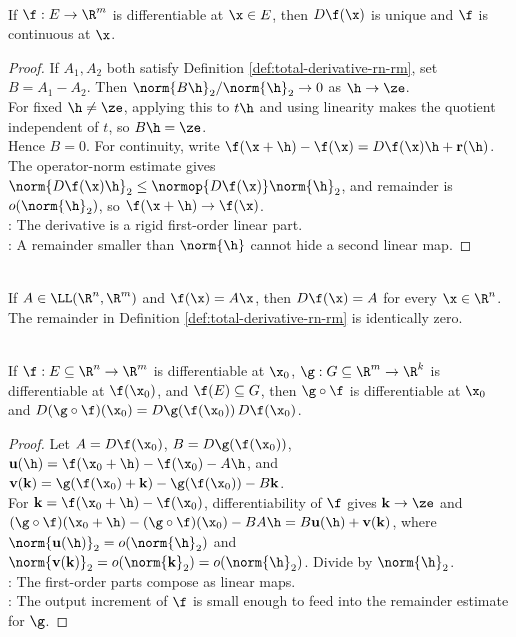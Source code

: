 \begin{theorem} \label{thm:total-derivative-unique-and-continuous}\label{thm:several-variable-differentiation-main-source-todo} \\
If $\f:E\to\R^m$ is differentiable at $\x\in E$, then $D\f(\x)$ is unique and $\f$ is continuous at $\x$.
\begin{proof}
If $A_1,A_2$ both satisfy Definition \ref{def:total-derivative-rn-rm}, set $B=A_1-A_2$. Then $\norm{B\h}_2/\norm{\h}_2\to0$ as $\h\to\ze$.\\
For fixed $\h\neq\ze$, applying this to $t\h$ and using linearity makes the quotient independent of $t$, so $B\h=\ze$.\\
Hence $B=0$. For continuity, write $\f(\x+\h)-\f(\x)=D\f(\x)\h+\mathbf{r}(\h)$.\\
The operator-norm estimate gives $\norm{D\f(\x)\h}_2\leq\normop{D\f(\x)}\norm{\h}_2$, and remainder is $o(\norm{\h}_2)$, so $\f(\x+\h)\to\f(\x)$.\\
: The derivative is a rigid first-order linear part.\\
: A remainder smaller than $\norm{\h}$ cannot hide a second linear map.
\end{proof}
\end{theorem}

\begin{example} \label{ex:derivative-of-linear-map} \\
If $A\in\LL(\R^n,\R^m)$ and $\f(\x)=A\x$, then $D\f(\x)=A$ for every $\x\in\R^n$.\\
The remainder in Definition \ref{def:total-derivative-rn-rm} is identically zero.
\end{example}

\begin{theorem} \label{thm:chain-rule-several-variables} \\
If $\f:E\subseteq\R^n\to\R^m$ is differentiable at $\x_0$, $\g:G\subseteq\R^m\to\R^k$ is differentiable at $\f(\x_0)$, and $\f(E)\subseteq G$, then $\g\circ\f$ is differentiable at $\x_0$ and $D(\g\circ\f)(\x_0)=D\g(\f(\x_0))\,D\f(\x_0)$.
\begin{proof}
Let $A=D\f(\x_0)$, $B=D\g(\f(\x_0))$, $\mathbf{u}(\h)=\f(\x_0+\h)-\f(\x_0)-A\h$, and $\mathbf{v}(\mathbf{k})=\g(\f(\x_0)+\mathbf{k})-\g(\f(\x_0))-B\mathbf{k}$.\\
For $\mathbf{k}=\f(\x_0+\h)-\f(\x_0)$, differentiability of $\f$ gives $\mathbf{k}\to\ze$ and $(\g\circ\f)(\x_0+\h)-(\g\circ\f)(\x_0)-BA\h =B\mathbf{u}(\h)+\mathbf{v}(\mathbf{k})$, where $\norm{\mathbf{u}(\h)}_2=o(\norm{\h}_2)$ and $\norm{\mathbf{v}(\mathbf{k})}_2=o(\norm{\mathbf{k}}_2)=o(\norm{\h}_2)$. Divide by $\norm{\h}_2$.\\
: The first-order parts compose as linear maps.\\
: The output increment of $\f$ is small enough to feed into the remainder estimate for $\g$.
\end{proof}
\end{theorem}

